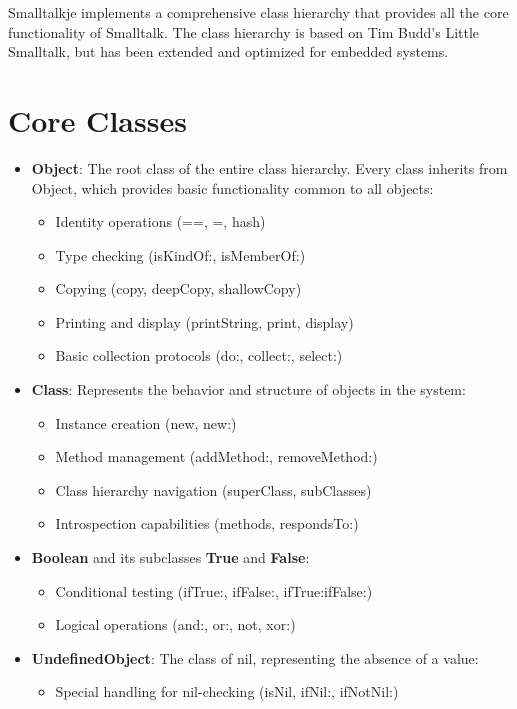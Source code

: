 \documentclass[12pt,a4paper]{report}
\begin{document}
Smalltalkje implements a comprehensive class hierarchy that provides all the core functionality of Smalltalk. The class hierarchy is based on Tim Budd's Little Smalltalk, but has been extended and optimized for embedded systems.

\section{Core Classes}

\begin{itemize}
    \item \textbf{Object}: The root class of the entire class hierarchy. Every class inherits from Object, which provides basic functionality common to all objects:
    \begin{itemize}
        \item Identity operations (==, =, hash)
        \item Type checking (isKindOf:, isMemberOf:)
        \item Copying (copy, deepCopy, shallowCopy)
        \item Printing and display (printString, print, display)
        \item Basic collection protocols (do:, collect:, select:)
    \end{itemize}

    \item \textbf{Class}: Represents the behavior and structure of objects in the system:
    \begin{itemize}
        \item Instance creation (new, new:)
        \item Method management (addMethod:, removeMethod:)
        \item Class hierarchy navigation (superClass, subClasses)
        \item Introspection capabilities (methods, respondsTo:)
    \end{itemize}

    \item \textbf{Boolean} and its subclasses \textbf{True} and \textbf{False}:
    \begin{itemize}
        \item Conditional testing (ifTrue:, ifFalse:, ifTrue:ifFalse:)
        \item Logical operations (and:, or:, not, xor:)
    \end{itemize}

    \item \textbf{UndefinedObject}: The class of nil, representing the absence of a value:
    \begin{itemize}
        \item Special handling for nil-checking (isNil, ifNil:, ifNotNil:)
    \end{itemize}


\end{itemize}
\end{document}
